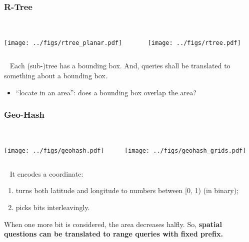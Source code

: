 \documentclass[lualatex]{beamer}
\renewcommand{\emph}{\textbf}
\begin{document}

\begin{frame}
  \frametitle{R-Tree}
  \begin{columns}[t]
    \begin{column}{0.3\textwidth}
      ~\\
      \texttt{[image: ../figs/rtree\_planar.pdf]}
    \end{column}
    \begin{column}{0.4\textwidth}
      ~\\
      \texttt{[image: ../figs/rtree.pdf]}
    \end{column}
  \end{columns}
  \begin{block}{~}
    Each (sub-)tree has a bounding box.
    And, queries shall be translated to something about a bounding box.
    \begin{itemize}
      \item ``locate in an area'': does a bounding box overlap the area?
    \end{itemize}
  \end{block}
\end{frame}

\begin{frame}
  \frametitle{Geo-Hash}
  \begin{columns}[t]
    \begin{column}{0.4\textwidth}
      ~\\
      \texttt{[image: ../figs/geohash.pdf]}
    \end{column}
    \begin{column}{0.4\textwidth}
      ~\\
      \texttt{[image: ../figs/geohash\_grids.pdf]}
    \end{column}
  \end{columns}
  \begin{block}{~}
    It encodes a coordinate:
    \begin{enumerate}
      \item turns both latitude and longitude to numbers between [0, 1) (in binary);
      \item picks bits interleavingly.
    \end{enumerate}
    When one more bit is considered, the area decreases halfly.
    So, \emph{spatial questions can be translated to range queries with fixed prefix.}
  \end{block}
\end{frame}
\end{document}
